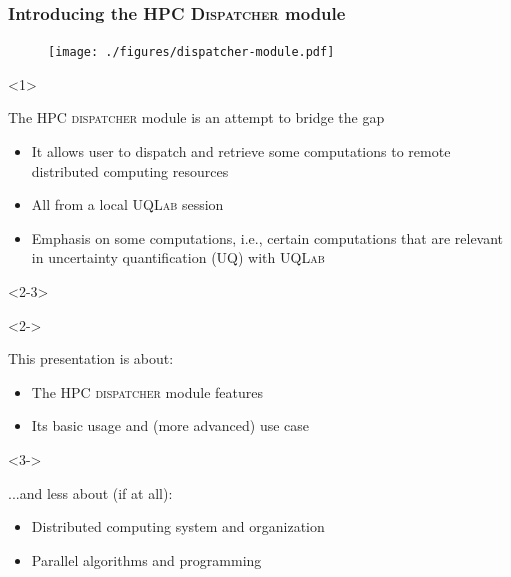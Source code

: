 \documentclass[]{rsuqbeamernew}
\begin{document}
\begin{frame}
\frametitle{Introducing the HPC \textsc{Dispatcher} module}

\begin{figure}[htbp]
  \texttt{[image: ./figures/dispatcher-module.pdf]}
\end{figure}    

\begin{onlyenv}<1>
\begin{block}{The HPC \textsc{dispatcher} module is an attempt to bridge the gap}
  \begin{itemize}
    \item It allows user to dispatch and retrieve {\altx some computations}
          to remote distributed computing resources
    \item All from a local \textsc{UQLab} session
    \item Emphasis on {\altx some computations}, i.e.,
          certain computations that are relevant in uncertainty quantification (UQ)
          with \textsc{UQLab}
  \end{itemize}
\end{block}
\end{onlyenv}

\begin{onlyenv}<2-3>
  \begin{onslide}<2->
  \begin{block}{This presentation is about:}
    \begin{itemize}
      \item The HPC \textsc{dispatcher} module features
      \item Its basic usage and (more advanced) use case
    \end{itemize}
  \end{block}
\end{onslide}

\begin{onslide}<3->
  \begin{block}{...and less about (if at all):}
    \begin{itemize}
      \item Distributed computing system and organization
      \item Parallel algorithms and programming
    \end{itemize}
  \end{block}
\end{onslide}
\end{onlyenv}

\end{frame}
\end{document}
